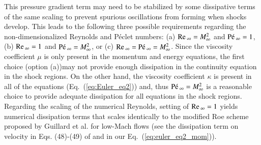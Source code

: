 \documentclass[preprint,10pt]{elsarticle}
\renewcommand{\Re}{\textrm{Re\,}}
\newcommand{\Pe}{\textrm{P\'e\,}}
\newcommand{\eqt}[1]{Eq.~(\ref{#1})}                     %
\begin{document}
This pressure gradient term may need to be stabilized by some dissipative terms of the same scaling to prevent spurious oscillations from forming when shocks develop. This leads to the following three possible requirements regarding the non-dimensionalized Reynolds and P\'eclet numbers: 
(a) $\Re_\infty = M_\infty^2$ and $\Pe_\infty = 1$,
(b) $\Re_\infty = 1$ and $\Pe_\infty = M_\infty^2$, or
(c) $\Re_\infty = \Pe_\infty = M_\infty^2$. 
%
Since the viscosity coefficient $\mu$ is only present in the momentum and energy equations, the first choice (option (a))may not provide enough dissipation in the continuity equation in the shock regions. On the other hand, the viscosity coefficient $\kappa$ is present in all of the equations (\eqt{eq:Euler_eq2}) and, thus $\Pe_\infty = M_\infty^2$ is a reasonable choice to provide adequate dissipation for all equations in the shock regions. Regarding the scaling of the numerical Reynolds, setting of $\Re_\infty=1$ yields numerical dissipation terms that scales identically to the modified Roe scheme proposed by Guillard et al. for low-Mach flows \cite{LowMach1} (see the dissipation term on velocity in Eqs. (48)-(49) of \cite{LowMach1} and in our \eqt{eq:euler_eq2_mom}).
\end{document}
